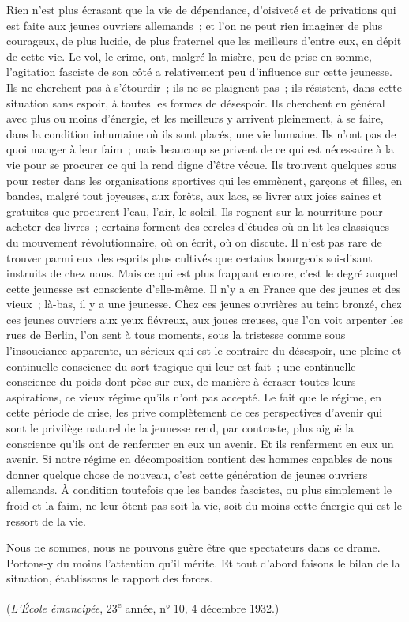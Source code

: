\documentclass[french,twoside]{book} %
\begin{document}
Rien n'est plus écrasant que la vie de dépendance, d'oisiveté et de privations qui est faite aux jeunes ouvriers allemands ; et l'on ne peut rien imaginer de plus courageux, de plus lucide, de plus fraternel que les meilleurs d'entre eux, en dépit de cette vie. Le vol, le crime, ont, malgré la misère, peu de prise en somme, l'agitation fasciste de son côté a relativement peu d'in­fluence sur cette jeunesse. Ils ne cherchent pas à s'étourdir ; ils ne se plaignent pas ; ils résistent, dans cette situation sans espoir, à toutes les formes de désespoir. Ils cherchent en général avec plus ou moins d'énergie, et les meilleurs y arrivent pleinement, à se faire, dans la condition inhumaine où ils sont placés, une vie humaine. Ils n'ont pas de quoi manger à leur faim ; mais beaucoup se privent de ce qui est nécessaire à la vie pour se procurer ce qui la rend digne d'être vécue. Ils trouvent quelques sous pour rester dans les organisations sportives qui les emmènent, garçons et filles, en bandes, malgré tout joyeuses, aux forêts, aux lacs, se livrer aux joies saines et gratuites que procurent l'eau, l'air, le soleil. Ils rognent sur la nourriture pour acheter des livres ; certains forment des cercles d'études où on lit les classiques du mouvement révolutionnaire, où on écrit, où on discute. Il n'est pas rare de trouver parmi eux des esprits plus cultivés que certains bourgeois soi-disant instruits de chez nous. Mais ce qui est plus frappant encore, c'est le degré auquel cette jeunesse est consciente d'elle-même. Il n'y a en France que des jeunes et des vieux ; là-bas, il y a une jeunesse. Chez ces jeunes ouvrières au teint bronzé, chez ces jeunes ouvriers aux yeux fiévreux, aux joues creuses, que l'on voit arpenter les rues de Berlin, l'on sent à tous moments, sous la tristesse comme sous l'insouciance apparente, un sérieux qui est le contraire du désespoir, une pleine et continuelle conscience du sort tragique qui leur est fait ; une continuelle conscience du poids dont pèse sur eux, de manière à écraser toutes leurs aspirations, ce vieux régime qu'ils n'ont pas accepté. Le fait que le régime, en cette période de crise, les prive complètement de ces perspectives d'avenir qui sont le privilège naturel de la jeunesse rend, par contraste, plus aiguë la conscience qu'ils ont de renfermer en eux un avenir. Et ils renferment en eux un avenir. Si notre régime en décomposition contient des hommes capables de nous donner quelque chose de nouveau, c'est cette génération de jeunes ouvriers allemands. À condition toutefois que les bandes fascistes, ou plus simplement le froid et la faim, ne leur ôtent pas soit la vie, soit du moins cette énergie qui est le ressort de la vie.\par
Nous ne sommes, nous ne pouvons guère être que spectateurs dans ce drame. Portons-y du moins l'attention qu'il mérite. Et tout d'abord faisons le bilan de la situation, établissons le rapport des forces.\par
({\itshape L'École émancipée}, 23\textsuperscript{e} année, n° 10, 4 décembre 1932.)
\end{document}
